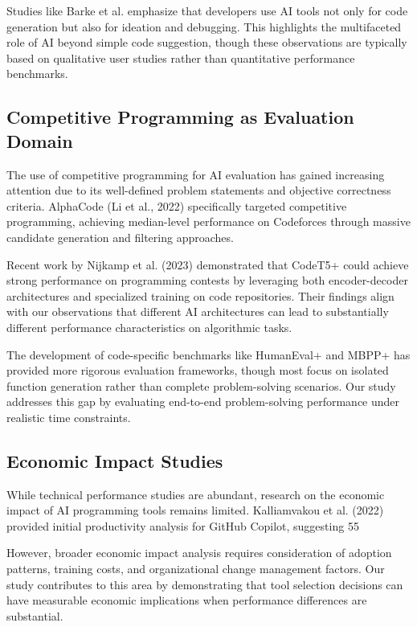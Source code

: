 \documentclass[conference]{IEEEtran}
\begin{document}
Studies like Barke et al. emphasize that developers use AI tools not only for code generation but also for ideation and debugging. This highlights the multifaceted role of AI beyond simple code suggestion, though these observations are typically based on qualitative user studies rather than quantitative performance benchmarks.

\subsection{Competitive Programming as Evaluation Domain}

The use of competitive programming for AI evaluation has gained increasing attention due to its well-defined problem statements and objective correctness criteria. AlphaCode (Li et al., 2022) specifically targeted competitive programming, achieving median-level performance on Codeforces through massive candidate generation and filtering approaches.

Recent work by Nijkamp et al. (2023) demonstrated that CodeT5+ could achieve strong performance on programming contests by leveraging both encoder-decoder architectures and specialized training on code repositories. Their findings align with our observations that different AI architectures can lead to substantially different performance characteristics on algorithmic tasks.

The development of code-specific benchmarks like HumanEval+ and MBPP+ has provided more rigorous evaluation frameworks, though most focus on isolated function generation rather than complete problem-solving scenarios. Our study addresses this gap by evaluating end-to-end problem-solving performance under realistic time constraints.

\subsection{Economic Impact Studies}

While technical performance studies are abundant, research on the economic impact of AI programming tools remains limited. Kalliamvakou et al. (2022) provided initial productivity analysis for GitHub Copilot, suggesting 55%

However, broader economic impact analysis requires consideration of adoption patterns, training costs, and organizational change management factors. Our study contributes to this area by demonstrating that tool selection decisions can have measurable economic implications when performance differences are substantial.
\end{document}
